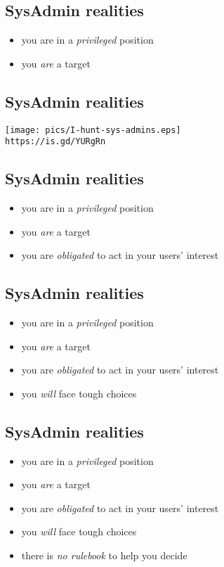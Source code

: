 \documentclass[xga]{xdvislides}
\begin{document}
\subsection{SysAdmin realities}
\begin{itemize}
	\item you are in a {\em privileged} position
	\item you {\em are} a target
\end{itemize}

\subsection{SysAdmin realities}
\begin{center}
	\texttt{[image: pics/I-hunt-sys-admins.eps]} \\
	\small
	{\tt https://is.gd/YURgRn}\hspace{.5in}{\tt https://is.gd/u8ni1B}
	\Normalsize
\end{center}

\subsection{SysAdmin realities}
\begin{itemize}
	\item you are in a {\em privileged} position
	\item you {\em are} a target
	\item you are {\em obligated} to act in your users' interest
\end{itemize}

\subsection{SysAdmin realities}
\begin{itemize}
	\item you are in a {\em privileged} position
	\item you {\em are} a target
	\item you are {\em obligated} to act in your users' interest
	\item you {\em will} face tough choices
\end{itemize}

\subsection{SysAdmin realities}
\begin{itemize}
	\item you are in a {\em privileged} position
	\item you {\em are} a target
	\item you are {\em obligated} to act in your users' interest
	\item you {\em will} face tough choices
	\item there is {\em no rulebook} to help you decide
\end{itemize}
\end{document}
